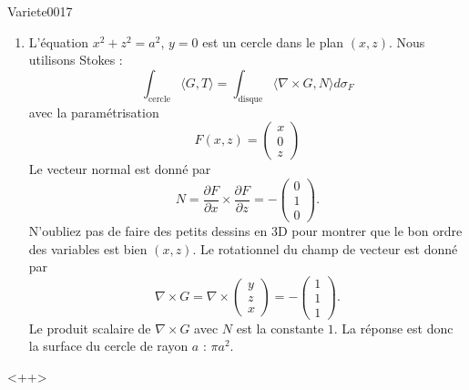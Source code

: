 \begin{corrige}{Variete0017}
\begin{enumerate}
		\item
			L'équation $x^2+z^2=a^2$, $y=0$ est un cercle dans le plan $(x,z)$. Nous utilisons Stokes :
			\begin{equation}
				\int_{\text{cercle}}\langle G, T\rangle =\int_{\text{disque}}\langle \nabla\times G, N\rangle d\sigma_F
			\end{equation}
			avec la paramétrisation
			\begin{equation}
				F(x,z)=\begin{pmatrix}
					x	\\ 
					0	\\ 
					z	
				\end{pmatrix}
			\end{equation}
			Le vecteur normal est donné par
			\begin{equation}
				N=\frac{ \partial F }{ \partial x }\times\frac{ \partial F }{ \partial z }=-\begin{pmatrix}
					0	\\ 
					1	\\ 
					0	
				\end{pmatrix}.
			\end{equation}
			N'oubliez pas de faire des petits dessins en 3D pour montrer que le bon ordre des variables est bien $(x,z)$. Le rotationnel du champ de vecteur est donné par
			\begin{equation}
				\nabla\times G=\nabla\times\begin{pmatrix}
					y	\\ 
					z	\\ 
					x	
				\end{pmatrix}=-\begin{pmatrix}
					1	\\ 
					1	\\ 
					1	
				\end{pmatrix}.
			\end{equation}
			Le produit scalaire de $\nabla\times G$ avec $N$ est la constante $1$. La réponse est donc la surface du cercle de rayon $a$ : $\pi a^2$.

	\end{enumerate}
	<++>

\end{corrige}
